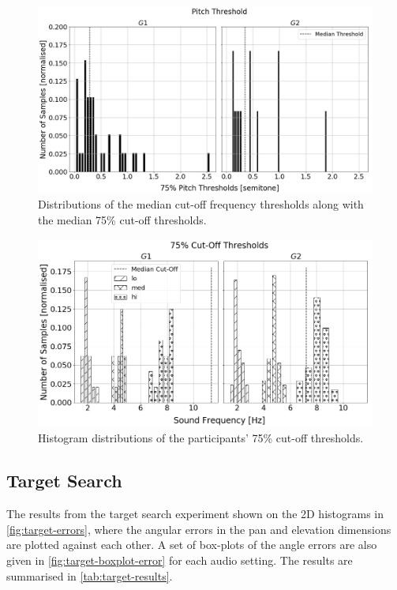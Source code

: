\documentclass[acmsmall]{acmart}
\begin{document}
\begin{figure}
  \centering
  \includegraphics[width=0.8\columnwidth]{figures/pitch_thresholds.png}
  \caption{Distributions of the median cut-off frequency thresholds along with the median 75\% cut-off thresholds. }\label{fig:pitch-thresholds}
\end{figure}

\begin{figure}
  \centering
  \includegraphics[width=0.8\columnwidth]{figures/pitch_thresholds_limits.png}
  \caption{Histogram distributions of the participants' 75\% cut-off thresholds. }\label{fig:pitch-thresholds-hist}
\end{figure}

\subsection{Target Search}

The results from the target search experiment shown on the 2D histograms in \cref{fig:target-errors}, where the angular errors in the pan and elevation dimensions are plotted against each other. 
A set of box-plots of the angle errors are also given in \cref{fig:target-boxplot-error} for each audio setting.
The results are summarised in \cref{tab:target-results}.
\end{document}
